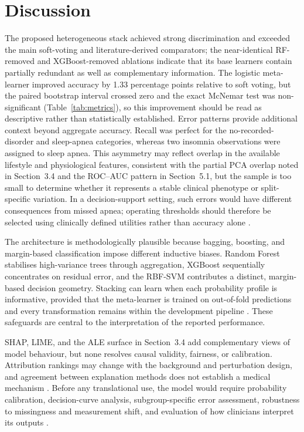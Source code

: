 \documentclass{elektr}
\begin{document}
\FloatBarrier
\section{Discussion}
The proposed heterogeneous stack achieved strong discrimination and exceeded the main soft-voting and literature-derived comparators; the near-identical RF-removed and XGBoost-removed ablations indicate that its base learners contain partially redundant as well as complementary information. The logistic meta-learner improved accuracy by 1.33 percentage points relative to soft voting, but the paired bootstrap interval crossed zero and the exact McNemar test was non-significant (Table~\ref{tab:metrics}), so this improvement should be read as descriptive rather than statistically established. Error patterns provide additional context beyond aggregate accuracy. Recall was perfect for the no-recorded-disorder and sleep-apnea categories, whereas two insomnia observations were assigned to sleep apnea. This asymmetry may reflect overlap in the available lifestyle and physiological features, consistent with the partial PCA overlap noted in Section~3.4 and the ROC--AUC pattern in Section~5.1, but the sample is too small to determine whether it represents a stable clinical phenotype or split-specific variation. In a decision-support setting, such errors would have different consequences from missed apnea; operating thresholds should therefore be selected using clinically defined utilities rather than accuracy alone \cite{riley2024,futureai2025}.

The architecture is methodologically plausible because bagging, boosting, and margin-based classification impose different inductive biases. Random Forest stabilises high-variance trees through aggregation, XGBoost sequentially concentrates on residual error, and the RBF-SVM contributes a distinct, margin-based decision geometry. Stacking can learn when each probability profile is informative, provided that the meta-learner is trained on out-of-fold predictions and every transformation remains within the development pipeline \cite{borisov2024,kapoor2023}. These safeguards are central to the interpretation of the reported performance.

SHAP, LIME, and the ALE surface in Section~3.4 add complementary views of model behaviour, but none resolves causal validity, fairness, or calibration. Attribution rankings may change with the background and perturbation design, and agreement between explanation methods does not establish a medical mechanism \cite{instanceshap2023,jung2023,pesapane2026}. Before any translational use, the model would require probability calibration, decision-curve analysis, subgroup-specific error assessment, robustness to missingness and measurement shift, and evaluation of how clinicians interpret its outputs \cite{hu2024,tripodai2024,futureai2025}.
\end{document}
